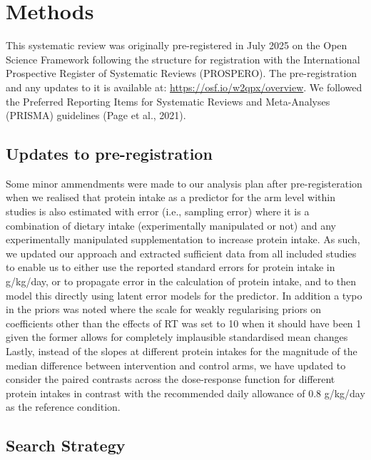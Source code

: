\documentclass[
]{article}
\begin{document}
\section{Methods}\label{methods}

This systematic review was originally pre-registered in July 2025 on the
Open Science Framework following the structure for registration with the
International Prospective Register of Systematic Reviews (PROSPERO). The
pre-registration and any updates to it is available at:
\url{https://osf.io/w2qpx/overview}. We followed the Preferred Reporting
Items for Systematic Reviews and Meta-Analyses (PRISMA) guidelines (Page
et al., 2021).

\subsection{Updates to
pre-registration}\label{updates-to-pre-registration}

Some minor ammendments were made to our analysis plan after
pre-registeration when we realised that protein intake as a predictor
for the arm level within studies is also estimated with error (i.e.,
sampling error) where it is a combination of dietary intake
(experimentally manipulated or not) and any experimentally manipulated
supplementation to increase protein intake. As such, we updated our
approach and extracted sufficient data from all included studies to
enable us to either use the reported standard errors for protein intake
in g/kg/day, or to propagate error in the calculation of protein intake,
and to then model this directly using latent error models for the
predictor. In addition a typo in the priors was noted where the scale
for weakly regularising priors on coefficients other than the effects of
RT was set to 10 when it should have been 1 given the former allows for
completely implausible standardised mean changes Lastly, instead of the
slopes at different protein intakes for the magnitude of the median
difference between intervention and control arms, we have updated to
consider the paired contrasts across the dose-response function for
different protein intakes in contrast with the recommended daily
allowance of 0.8 g/kg/day as the reference condition.

\subsection{Search Strategy}\label{search-strategy}
\end{document}
